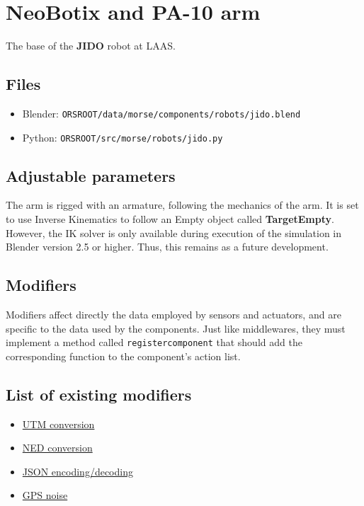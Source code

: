 \documentclass[twoside,a4paper,10pt]{report}
\newcommand{\dokutitlelevelone}[1]{\chapter{#1}}
\newcommand{\dokutitleleveltwo}[1]{\section{#1}}
\newcommand{\dokubold}[1]{\textbf{#1}}
\newcommand{\dokumonospace}[1]{\texttt{#1}}
\newcommand{\dokuitem}{\item}
\begin{document}
\dokutitlelevelone{NeoBotix and PA-10 arm}
\label{1eef7a1b9401d909bf39e4ac86c3785a}%
\label{3c16132d99703978dacd02b0808a4270}%

The base of the \dokubold{JIDO} robot at LAAS.


\dokutitleleveltwo{Files}
\label{45b963397aa40d4a0063e0d85e4fe7a1}%

\begin{itemize}
\dokuitem  Blender: \dokumonospace{{\textdollar}ORS{\textunderscore}ROOT/data/morse/components/robots/jido.blend}
\dokuitem  Python: \dokumonospace{{\textdollar}ORS{\textunderscore}ROOT/src/morse/robots/jido.py}
\end{itemize}

\dokutitleleveltwo{Adjustable parameters}
\label{4997feebf90104aab2d79756367e9b42}%

The arm is rigged with an armature, following the mechanics of the arm. It is set to use Inverse Kinematics to follow an Empty object called \dokubold{Target{\textunderscore}Empty}. However, the IK solver is only available during execution of the simulation in Blender version 2.5 or higher. Thus, this remains as a future development.

\dokutitleleveltwo{Modifiers}
\label{bf24b44a8cc99e648657b164c8aba758}%
\label{25bc6523e9298f4691b3c8200a395d92}%

Modifiers affect directly the data employed by sensors and actuators, and are specific to the data used by the components. Just like middlewares, they must implement a method called \dokumonospace{register{\textunderscore}component} that should add the corresponding function to the component's action list.


\dokutitleleveltwo{List of existing modifiers}
\label{e1bd7dc12fc91796f6afa908960bddfd}%

\begin{itemize}
\dokuitem  \hyperref[b32d6491ce03dd4e6c877f3bfd9ff07e]{ UTM conversion}
\dokuitem  \hyperref[f68daad189b2fffd0b8cab5e36ec9d96]{ NED conversion}
\dokuitem  \hyperref[466deec76ecdf5fca6d38571f6324d54]{ JSON encoding/decoding}
\dokuitem  \hyperref[aa061f2a51a69b41bf030cab71d64ed9]{ GPS noise}
\end{itemize}
\end{document}
